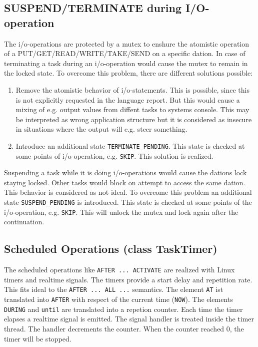 \subsection{SUSPEND/TERMINATE during I/O-operation}
The i/o-operations are protected by a mutex to enshure the atomistic 
operation of a PUT/GET/READ/WRITE/TAKE/SEND on a specific dation.
In case of terminating a task during an i/o-operation would cause
the mutex to remain in the locked state.
To overcome this problem, there are different solutions possible:
\begin{enumerate}
\item Remove the atomistic behavior of i/o-statements. This is possible,
   since this is not explicitly requested in the language report.
   But this would cause a mixing of e.g. output values from diffent
   tasks to systems console. This may be interpreted as wrong application
   structure but it is considered as insecure in situations where the
   output will e.g. steer something.
\item Introduce an additional state \verb|TERMINATE_PENDING|. This state
   is checked at some points of i/o-operation, e.g. \verb|SKIP|.
   This solution is realized.
\end{enumerate}


Suspending a task while it is doing i/o-operations would cause the dations
lock staying locked. Other tasks would block on attempt to access the same
dation. This behavior is considered as not ideal. To overcome this problem
an additional state \verb|SUSPEND_PENDING| is introduced. This state is
checked at some points of the i/o-operation, e.g. \verb|SKIP|. This will
unlock the mutex and lock again after the continuation.

\subsection{Scheduled Operations (class TaskTimer)}
The scheduled operations like \verb|AFTER ... ACTIVATE| are realized with
Linux timers and realtime signals. 
The timers provide a start delay and repetition rate. This fits ideal to
the \verb|AFTER ... ALL ...| semantics.
The element \verb|AT| ist translated into \verb|AFTER| with respect of the current
time (\verb|NOW|).
The elements \verb|DURING| and \verb|until| are translated into a repetion 
counter. Each time the timer elapses a realtime signal is emitted.
The signal handler is treated inside the timer thread.
The handler decrements the counter.
When the counter reached 0, the timer will be stopped.

